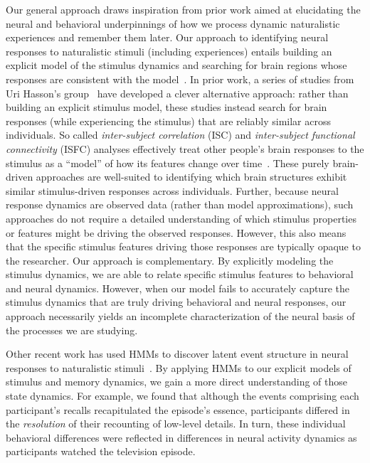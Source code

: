 \documentclass[10pt]{article}
\begin{document}
Our general approach draws inspiration from prior work aimed at elucidating the neural and behavioral underpinnings of how we process dynamic naturalistic experiences and remember them later.  Our approach to identifying neural responses to naturalistic stimuli (including experiences) entails building an explicit model of the stimulus dynamics and searching for brain regions whose responses are consistent with the model~\citep[also see][]{HuthEtal12, HuthEtal16}.  In prior work, a series of studies from Uri Hasson's group~\citep{LernEtal11, SimoEtal16, ChenEtal17, BaldEtal17, ZadbEtal17} have developed a clever alternative approach: rather than building an explicit stimulus model, these studies instead search for brain responses (while experiencing the stimulus) that are reliably similar across individuals.  So called \textit{inter-subject correlation} (ISC) and \textit{inter-subject functional connectivity} (ISFC) analyses effectively treat other people's brain responses to the stimulus as a ``model'' of how its features change over time~\citep[also see][]{SimoChan20}.  These purely brain-driven approaches are well-suited to identifying which brain structures exhibit similar stimulus-driven responses across individuals.  Further, because neural response dynamics are observed data (rather than model approximations), such approaches do not require a detailed understanding of which stimulus properties or features might be driving the observed responses.  However, this also means that the specific stimulus features driving those responses are typically opaque to the researcher.  Our approach is complementary.  By explicitly modeling the stimulus dynamics, we are able to relate specific stimulus features to behavioral and neural dynamics.  However, when our model fails to accurately capture the stimulus dynamics that are truly driving behavioral and neural responses, our approach necessarily yields an incomplete characterization of the neural basis of the processes we are studying.

Other recent work has used HMMs to discover latent event structure in neural responses to naturalistic stimuli~\citep{BaldEtal17}.  By applying HMMs to our explicit models of stimulus and memory dynamics, we gain a more direct understanding of those state dynamics.  For example, we found that although the events comprising each participant's recalls recapitulated the episode's essence, participants differed in the \textit{resolution} of their recounting of low-level details.  In turn, these individual behavioral differences were reflected in differences in neural activity dynamics as participants watched the television episode.
\end{document}

